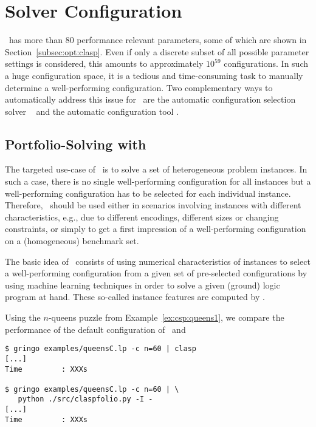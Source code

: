 
\section{Solver Configuration}
\label{sec:configuration}

\clasp\ has more than $80$ performance relevant parameters, some of which are shown in Section~\ref{subsec:opt:clasp}.
Even if only a discrete subset of all possible parameter settings is considered,
this amounts to approximately $10^{59}$ configurations.
In such a huge configuration space, 
it is a tedious and time-consuming task 
to manually determine a well-performing configuration.
Two complementary ways to automatically address this issue for \clasp\ are 
the automatic configuration selection solver \claspfolio~\cite{holisc14a} and 
the automatic configuration tool \piclasp.%

\subsection{Portfolio-Solving with \claspfolio}
\label{sec:claspfolio}

The targeted use-case of \claspfolio\ is to solve a set of heterogeneous problem instances.
In such a case,
there is no single well-performing configuration for all instances
but a well-performing configuration has to be selected for each individual instance.
Therefore, \claspfolio\ should be used either 
in scenarios involving instances with different characteristics, 
e.g., due to different encodings, different sizes or changing constraints,
or 
simply to get a first impression of a well-performing configuration on a (homogeneous) benchmark set. 

The basic idea of \claspfolio\ consists of using numerical characteristics of instances
to select a well-performing configuration from a given set of pre-selected configurations
by using machine learning techniques
in order to solve a given (ground) logic program at hand.
These so-called instance features are computed by \claspre. %

Using the $n$-queens puzzle from Example~\ref{ex:csp:queens1}, 
we compare the performance of the default configuration of \clasp\ 
and \claspfolio{}
\begin{lstlisting}[numbers=none]
$ gringo examples/queensC.lp -c n=60 | clasp
[...]
Time         : XXXs

$ gringo examples/queensC.lp -c n=60 | \
   python ./src/claspfolio.py -I -
[...]
Time         : XXXs
\end{lstlisting}

